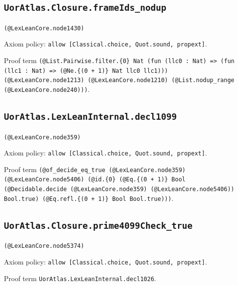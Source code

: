 \documentclass[11pt]{article}
\begin{document}
\subsection*{\texttt{UorAtlas.Closure.frameIds\_nodup}}
\noindent\texttt{(@LexLeanCore.node1430)}\par
\noindent Axiom policy: \texttt{allow [Classical.choice, Quot.sound, propext]}.\par
\noindent Proof term \texttt{(@List.Pairwise.filter.\{0\} Nat (fun (llc0 : Nat) => (fun (llc1 : Nat) => (@Ne.\{(0 + 1)\} Nat llc0 llc1))) (@LexLeanCore.node1213) (@LexLeanCore.node1210) (@List.nodup\_range (@LexLeanCore.node240)))}.\par
\subsection*{\texttt{UorAtlas.LexLeanInternal.decl1099}}
\noindent\texttt{(@LexLeanCore.node359)}\par
\noindent Axiom policy: \texttt{allow [Classical.choice, Quot.sound, propext]}.\par
\noindent Proof term \texttt{(@of\_decide\_eq\_true (@LexLeanCore.node359) (@LexLeanCore.node5406) (@id.\{0\} (@Eq.\{(0 + 1)\} Bool (@Decidable.decide (@LexLeanCore.node359) (@LexLeanCore.node5406)) Bool.true) (@Eq.refl.\{(0 + 1)\} Bool Bool.true)))}.\par
\subsection*{\texttt{UorAtlas.Closure.prime4099Check\_true}}
\noindent\texttt{(@LexLeanCore.node5374)}\par
\noindent Axiom policy: \texttt{allow [Classical.choice, Quot.sound, propext]}.\par
\noindent Proof term \texttt{UorAtlas.LexLeanInternal.decl1026}.\par
\end{document}

